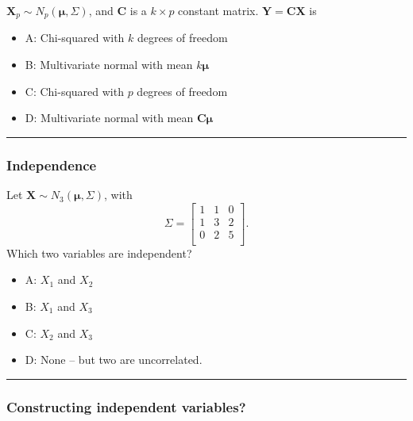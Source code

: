 \documentclass[]{article}
\providecommand{\tightlist}{%
  \setlength{\itemsep}{0pt}\setlength{\parskip}{0pt}}
\begin{document}
\(\mathbf{X}_p \sim N_p(\mathbf{\mu},\Sigma)\), and \(\mathbf{C}\) is a
\(k \times p\) constant matrix. \(\mathbf{Y}=\mathbf{C}\mathbf{X}\) is

\begin{itemize}
\tightlist
\item
  A: Chi-squared with \(k\) degrees of freedom
\item
  B: Multivariate normal with mean \(k\mathbf{\mu}\)
\item
  C: Chi-squared with \(p\) degrees of freedom
\item
  D: Multivariate normal with mean \(\mathbf{C}\mathbf{\mu}\)
\end{itemize}

\begin{center}\rule{0.5\linewidth}{\linethickness}\end{center}

\hypertarget{independence}{%
\subsubsection{Independence}\label{independence}}

Let \(\mathbf{X}\sim N_3(\mathbf{\mu},\Sigma)\), with
\[\Sigma= \left[     
\begin{array}{ccc} 1&1&0\\
      1&3&2\\
      0&2&5\\
          \end{array}
          \right].\] Which two variables are independent?

\begin{itemize}
\tightlist
\item
  A: \(X_1\) and \(X_2\)
\item
  B: \(X_1\) and \(X_3\)
\item
  C: \(X_2\) and \(X_3\)
\item
  D: None -- but two are uncorrelated.
\end{itemize}

\begin{center}\rule{0.5\linewidth}{\linethickness}\end{center}

\hypertarget{constructing-independent-variables}{%
\subsubsection{Constructing independent
variables?}\label{constructing-independent-variables}}
\end{document}
